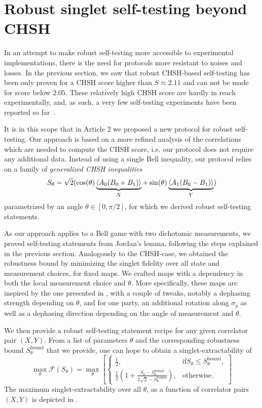 \section{Robust singlet self-testing beyond CHSH}

In an attempt to make robust self-testing more accessible to experimental implementations, there is the need for protocols more resistant to noises and losses.
In the previous section, we saw that robust CHSH-based self-testing has been only proven for a CHSH score higher than $S\approx 2.11$ and can not be made for score below $2.05$.
These relatively high CHSH score are hardly in reach experimentally, and, as such, a very few self-testing experiments have been reported so far~\cite{Tan2017,Bancal2021}.

It is in this scope that in Article 2 we proposed a new protocol for robust self-testing.
Our approach is based on a more refined analysis of the correlations which are needed to compute the CHSH score, i.e. our protocol does not require any additional data.
Instead of using a single Bell inequality, our protocol relies on a family of \textit{generalized CHSH inequalities}
\begin{equation}
S_\theta = \sqrt{2}(\cos(\theta) \underbrace{\langle {A_0(B_0+B_1)} \rangle}_{X} + \sin(\theta)\underbrace{\langle {A_1(B_0-B_1)} \rangle}_{Y})
	\label{eq:}
\end{equation}
parametrized by an angle $\theta \in [0,\pi/2]$, for which we derived robust self-testing statements.

As our approach applies to a Bell game with two dichotomic measurements, we proved self-testing statements from Jordan's lemma, following the steps explained in the previous section. 
Analogously to the CHSH-case, we obtained the robustness bound by minimizing the singlet fidelity over all state and measurement choices, for fixed maps.
We crafted maps with a dependency in both the local measurement choice and $\theta$.
More specifically, these maps are inspired by the one presented in , with a couple of tweaks, notably a dephasing strength depending on $\theta$, and for one party, an additional rotation along $\sigma_y$ as well as a dephasing direction depending on the angle of measurement and $\theta$.

We then provide a robust self-testing statement recipe for any given correlator pair $(X,Y)$.
From a list of parameters $\theta$ and the corresponding robustness bound $S_\theta^\text{bound}$ that we provide, one can hope to obtain a singlet-extractability of 
\begin{equation}
	\max_\theta \mathcal{F}(S_\theta) = \max_\theta \left[ \begin{cases}
			\frac{1}{2},& \text{if} S_\theta \leq S_\theta^\text{bound}, \\
			\frac{1}{2}\left(1+\frac{S_\theta - S_\theta^\text{bound}}{2\sqrt{2}-S_\theta^\text{bound}}\right), & \text{otherwise}.
	\end{cases} \right]
	\label{eq:singlet-extractability-theta}
\end{equation}
The maximum singlet-extractability over all $\theta$, as a function of correlator pairs $(X,Y)$ is depicted in .

